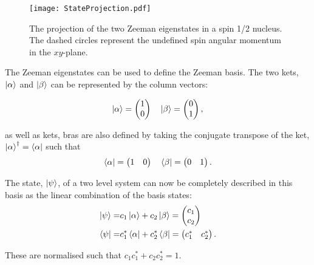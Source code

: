 \begin{figure}
  \begin{center}
  \texttt{[image: StateProjection.pdf]}
  \end{center}
  \caption{The projection of the two Zeeman eigenstates in a spin 1/2 nucleus. The dashed
  circles represent the undefined spin angular momentum in the $xy$-plane.}
  \label{fig:Projection}
\end{figure}


The Zeeman eigenstates can be used to define the Zeeman basis. The two kets, $\ket{\alpha}$ and $\ket{\beta}$ can be represented by the column vectors:

\begin{equation}
  \ket{\alpha} = \begin{pmatrix}
    1\\
    0
\end{pmatrix}\quad
 \ket{\beta} = \begin{pmatrix}
   0\\
   1
\end{pmatrix},
\end{equation}

as well as kets, bras are also defined by taking the conjugate transpose of the ket, $\ket{\alpha}^{\dagger} =
\bra{\alpha}$ such that
\begin{equation}
  \bra{\alpha} = \begin{pmatrix}
    1 & 0
\end{pmatrix}\quad
  \bra{\beta} = \begin{pmatrix}
  0 & 1
\end{pmatrix}.
\end{equation}

The state, $\ket{\psi}$, of a two level system can now be completely described in this basis
as the linear combination of the basis states:
\begin{align}\label{eqn:zeeman}
  \ket{\psi} =& c_1\ket{\alpha} + c_2\ket{\beta} = \begin{pmatrix}
    c_1\\
    c_2
\end{pmatrix}\\
  \bra{\psi} =& c_1^*\bra{\alpha} + c_2^*\bra{\beta} = \begin{pmatrix}
    c_1^* & c_2^*
\end{pmatrix}.
\end{align}

These are normalised such that $c_1c_1^* + c_2c_2^* = 1$.


